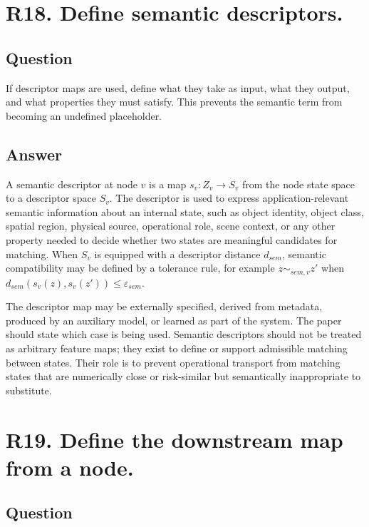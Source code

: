 \documentclass[11pt,a4paper]{article}
\begin{document}
\section*{R18. Define semantic descriptors.}

\subsection*{Question}

If descriptor maps are used, define what they take as input, what they output, and what properties they must satisfy. This prevents the semantic term from becoming an undefined placeholder.

\subsection*{Answer}

A semantic descriptor at node \(v\) is a map \(s_v: Z_v \to S_v\) from the node state space to a descriptor space \(S_v\). The descriptor is used to express application-relevant semantic information about an internal state, such as object identity, object class, spatial region, physical source, operational role, scene context, or any other property needed to decide whether two states are meaningful candidates for matching. When \(S_v\) is equipped with a descriptor distance \(d_{sem}\), semantic compatibility may be defined by a tolerance rule, for example \(z \sim_{sem,v} z'\) when \(d_{sem}(s_v(z), s_v(z')) \leq \varepsilon_{sem}\).

The descriptor map may be externally specified, derived from metadata, produced by an auxiliary model, or learned as part of the system. The paper should state which case is being used. Semantic descriptors should not be treated as arbitrary feature maps; they exist to define or support admissible matching between states. Their role is to prevent operational transport from matching states that are numerically close or risk-similar but semantically inappropriate to substitute.

\section*{R19. Define the downstream map from a node.}

\subsection*{Question}
\end{document}
